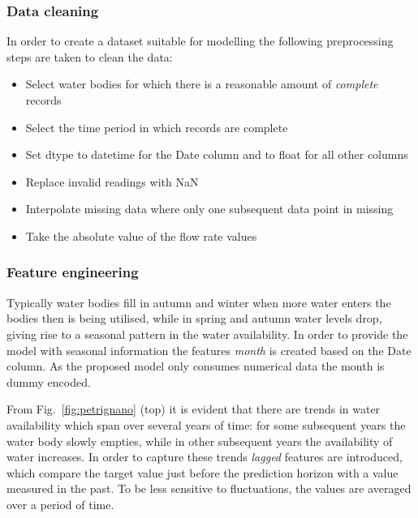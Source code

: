 \documentclass{article}
\begin{document}
\subsubsection*{Data cleaning}

In order to create a dataset suitable for modelling the following preprocessing steps are taken to clean the data:


\begin{itemize}
\item Select water bodies for which there is a reasonable amount of \emph{complete} records
\item Select the time period in which records are complete
\item Set dtype to datetime for the Date column and to float for all other columns
\item Replace invalid readings with NaN
\item Interpolate missing data where only one subsequent data point in missing
\item Take the absolute value of the flow rate values
\end{itemize}

\subsubsection*{Feature engineering}

Typically water bodies fill in autumn and winter when more water enters the bodies then is being utilised, while in spring and autumn water levels drop, giving rise to a seasonal pattern in the water availability. In order to provide the model with seasonal information the features \emph{month} is created based on the Date column. As the proposed model only consumes numerical data the month is dummy encoded. 

From Fig.~\ref{fig:petrignano} (top) it is evident that there are trends in water availability which span over several years of time: for some subsequent years the water body slowly empties, while in other subsequent years the availability of water increases. In order to capture these trends \emph{lagged} features are introduced, which compare the target value just before the prediction horizon with a value measured in the past. To be less sensitive to fluctuations, the values are averaged over a period of time.
\end{document}
